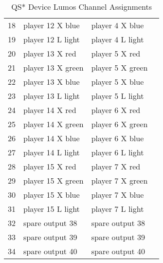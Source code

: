 \documentclass[letterpaper,twoside,onecolumn,openright,final]{memoir}
\begin{document}
\begin{QS}
\begin{table}
\begin{QS*}
\begin{center}
\begin{tabular}{rlll}
				18& player 12 X blue  & player 4 X blue \\
				19& player 12 L light  & player 4 L light \\
				20& player 13 X red  & player 5 X red \\
				21& player 13 X green  & player 5 X green \\
				22& player 13 X blue  & player 5 X blue \\
				23& player 13 L light  & player 5 L light \\
				24& player 14 X red  & player 6 X red \\
				25& player 14 X green  & player 6 X green \\
				26& player 14 X blue  & player 6 X blue \\
				27& player 14 L light  & player 6 L light \\
				28& player 15 X red  & player 7 X red \\
				29& player 15 X green  & player 7 X green \\
				30& player 15 X blue  & player 7 X blue \\
				31& player 15 L light  & player 7 L light \\
				32& spare output 38 & spare output 38 \\
				33& spare output 39 & spare output 39 \\
				34& spare output 40 & spare output 40 \\\bottomrule
			\end{tabular}
			\caption{QS* Device Lumos Channel Assignments\label{tbl:qslumoschannels}}
		\end{center}
	\end{QS*}
\end{table}
				

\end{QS}
\end{document}
